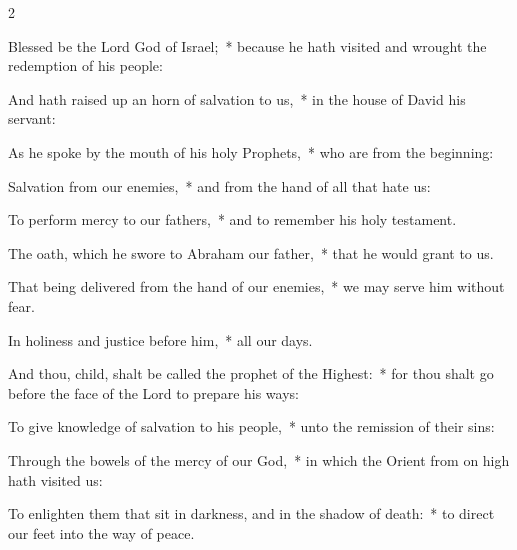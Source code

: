 
\begin{multicols}{2}
\begin{enpars}
 Blessed be the Lord \cc{} God of Israel;~* because he hath visited and wrought the redemption of his people:
 
 And hath raised up an horn of salvation to us,~* in the house of David his servant:
 
 As he spoke by the mouth of his holy Prophets,~* who are from the beginning:
 
 Salvation from our enemies,~* and from the hand of all that hate us:
 
 To perform mercy to our fathers,~* and to remember his holy testament.
 
 The oath, which he swore to Abraham our father,~* that he would grant to us.
 
 That being delivered from the hand of our enemies,~* we may serve him without fear.
 
 In holiness and justice before him,~* all our days.
 
 And thou, child, shalt be called the prophet of the Highest:~* for thou shalt go before the face of the Lord to prepare his ways:
 
 To give knowledge of salvation to his people,~* unto the remission of their sins:
 
 Through the bowels of the mercy of our God,~* in which the Orient from on high hath visited us:
 
 To enlighten them that sit in darkness, and in the shadow of death:~* to direct our feet into the way of peace.
\end{enpars}\end{multicols}